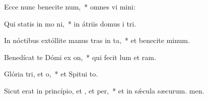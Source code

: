 \item Ecce nunc benecite num,~* omnes vi mini:
\item Qui statis in mo ni,~* in átriis domus i tri.
\item In nóctibus extóllite manus tras in ta,~* et benecite minum.
\item Benedícat te Dómi ex on,~* qui fecit lum et ram.
\item Glória tri, et o,~* et Spitui to.
\item Sicut erat in princípio, et , et per,~* et in sǽcula sæcurum. men.
